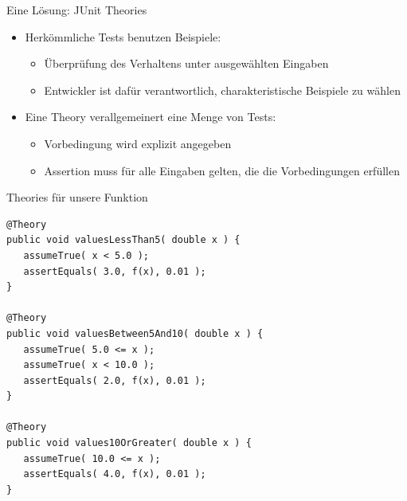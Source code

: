 \begin{frame}{Eine Lösung: JUnit Theories}
	\begin{itemize}
		\item Herkömmliche Tests benutzen Beispiele:
			\begin{itemize}
				\item Überprüfung des Verhaltens unter ausgewählten Eingaben
				\item Entwickler ist dafür verantwortlich, charakteristische Beispiele zu wählen
			\end{itemize}
		\item Eine Theory verallgemeinert eine Menge von Tests:
			\begin{itemize}
				\item Vorbedingung wird explizit angegeben
				\item Assertion muss für alle Eingaben gelten, die die Vorbedingungen erfüllen
			\end{itemize}
	\end{itemize}
\end{frame}




\begin{frame}[fragile]{Theories für unsere Funktion}
\begin{lstlisting}
@Theory
public void valuesLessThan5( double x ) {
   assumeTrue( x < 5.0 );
   assertEquals( 3.0, f(x), 0.01 );
}

@Theory
public void valuesBetween5And10( double x ) {
   assumeTrue( 5.0 <= x ); 
   assumeTrue( x < 10.0 );
   assertEquals( 2.0, f(x), 0.01 );
}

@Theory
public void values10OrGreater( double x ) {
   assumeTrue( 10.0 <= x );
   assertEquals( 4.0, f(x), 0.01 );
}
\end{lstlisting}
\end{frame}

